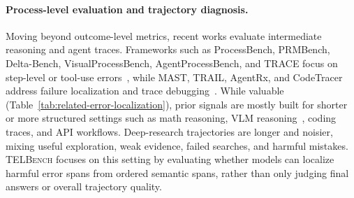 \paragraph{Process-level evaluation and trajectory diagnosis.}
Moving beyond outcome-level metrics, recent works evaluate intermediate reasoning and agent traces. Frameworks such as ProcessBench, PRMBench, Delta-Bench, VisualProcessBench, AgentProcessBench, and TRACE focus on step-level or tool-use errors~\citep{zheng-etal-2025-processbench, song2025prmbenchfinegrainedchallengingbenchmark, he2025largelanguagemodelsdetect, wang2025visualprm, fan2026agentprocessbenchdiagnosingsteplevelprocess, Kim2025BeyondTF}, while MAST, TRAIL, AgentRx, and CodeTracer address failure localization and trace debugging~\citep{cemri2025multiagentllmsystemsfail, deshpande2025trailtracereasoningagentic, barke2026agentrxdiagnosingaiagent, li2026codetracertraceableagentstates}. While valuable (Table~\ref{tab:related-error-localization}), prior signals are mostly built for shorter or more structured settings such as math reasoning, VLM reasoning~\citep{wei2026agentic}, coding traces, and API workflows. Deep-research trajectories are longer and noisier, mixing useful exploration, weak evidence, failed searches, and harmful mistakes. \textsc{TELBench} focuses on this setting by evaluating whether models can localize harmful error spans from ordered semantic spans, rather than only judging final answers or overall trajectory quality.

